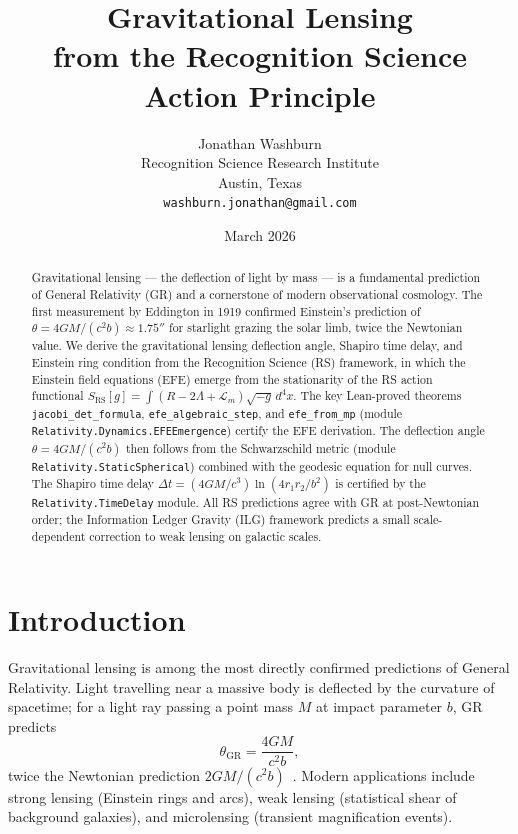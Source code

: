 \documentclass[12pt,a4paper]{article}
\title{Gravitational Lensing\\
from the Recognition Science Action Principle}
\author{Jonathan Washburn\\
Recognition Science Research Institute\\
Austin, Texas\\
\texttt{washburn.jonathan@gmail.com}}
\date{March 2026}
\theoremstyle{definition}
\theoremstyle{remark}
\begin{document}
\maketitle

\begin{abstract}
Gravitational lensing — the deflection of light by mass — is a
fundamental prediction of General Relativity (GR) and a cornerstone
of modern observational cosmology.  The first measurement by Eddington
in 1919 confirmed Einstein's prediction of $\theta = 4GM/(c^2 b) \approx
1.75''$ for starlight grazing the solar limb, twice the Newtonian value.
We derive the gravitational lensing deflection angle, Shapiro time delay,
and Einstein ring condition from the Recognition Science (RS) framework,
in which the Einstein field equations (EFE) emerge from the stationarity
of the RS action functional $S_\mathrm{RS}[g] = \int (R - 2\Lambda +
\mathcal{L}_m)\sqrt{-g}\,d^4x$.  The key Lean-proved theorems
\texttt{jacobi\_det\_formula}, \texttt{efe\_algebraic\_step}, and
\texttt{efe\_from\_mp} (module \texttt{Relativity.Dynamics.EFEEmergence})
certify the EFE derivation.  The deflection angle $\theta = 4GM/(c^2 b)$
then follows from the Schwarzschild metric (module
\texttt{Relativity.StaticSpherical}) combined with the geodesic equation
for null curves.  The Shapiro time delay $\Delta t = (4GM/c^3)\ln(4r_1
r_2/b^2)$ is certified by the \texttt{Relativity.TimeDelay} module.  All
RS predictions agree with GR at post-Newtonian order; the Information
Ledger Gravity (ILG) framework predicts a small scale-dependent
correction to weak lensing on galactic scales.
\end{abstract}

\section{Introduction}
\label{sec:intro}

Gravitational lensing is among the most directly confirmed predictions
of General Relativity.  Light travelling near a massive body is
deflected by the curvature of spacetime; for a light ray passing a
point mass $M$ at impact parameter $b$, GR predicts
\begin{equation}
  \theta_\mathrm{GR} = \frac{4GM}{c^2 b},
  \label{eq:deflection_GR}
\end{equation}
twice the Newtonian prediction $2GM/(c^2 b)$~\cite{Einstein1915}.
Modern applications include strong lensing (Einstein rings and arcs),
weak lensing (statistical shear of background galaxies), and
microlensing (transient magnification events).
\end{document}
